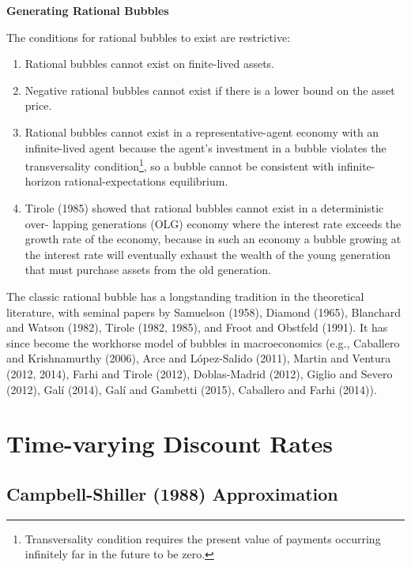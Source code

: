 \documentclass[
]{book}
\begin{document}
\textbf{Generating Rational Bubbles}

The conditions for rational bubbles to exist are restrictive:

\begin{enumerate}
\def\labelenumi{\arabic{enumi}.}
\item
  Rational bubbles cannot exist on finite-lived assets.
\item
  Negative rational bubbles cannot exist if there is a lower bound on the asset price.
\item
  Rational bubbles cannot exist in a representative-agent economy with an infinite-lived agent because the agent's investment in a bubble violates the transversality condition\footnote{Transversality condition requires the present value of payments occurring infinitely far in the future to be zero.}, so a bubble cannot be consistent with infinite-horizon rational-expectations equilibrium.
\item
  Tirole (1985) showed that rational bubbles cannot exist in a deterministic over- lapping generations (OLG) economy where the interest rate exceeds the growth rate of the economy, because in such an economy a bubble growing at the interest rate will eventually exhaust the wealth of the young generation that must purchase assets from the old generation.
\end{enumerate}

The classic rational bubble has a longstanding tradition in the theoretical literature, with seminal papers by Samuelson (1958), Diamond (1965), Blanchard and Watson (1982), Tirole (1982, 1985), and Froot and Obstfeld (1991). It has since become the workhorse model of bubbles in macroeconomics (e.g., Caballero and Krishnamurthy (2006), Arce and López-Salido (2011), Martin and Ventura (2012, 2014), Farhi and Tirole (2012), Doblas-Madrid (2012), Giglio and Severo (2012), Galí (2014), Galí and Gambetti (2015), Caballero and Farhi (2014)).

\hypertarget{time-varying-discount-rates}{%
\section{Time-varying Discount Rates}\label{time-varying-discount-rates}}

\hypertarget{campbell-shiller-1988-approximation}{%
\subsection{Campbell-Shiller (1988) Approximation}\label{campbell-shiller-1988-approximation}}
\end{document}
